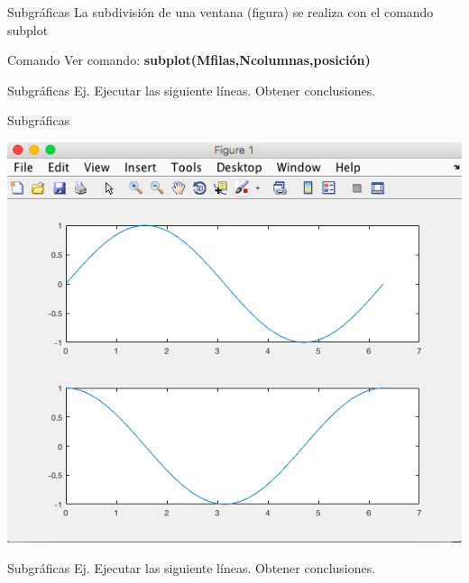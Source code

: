 \documentclass{bredelebeamer}
\begin{document}
\begin{frame}{Subgráficas}
La subdivisión de una ventana (figura) se realiza con el comando subplot
\begin{exampleblock}{Comando}
Ver comando: \textbf{subplot(Mfilas,Ncolumnas,posición)}
\end{exampleblock}
\end{frame}

\begin{frame}{Subgráficas}
Ej. Ejecutar las siguiente líneas. Obtener conclusiones.
\end{frame}

\begin{frame}{Subgráficas}
\begin{center}
\includegraphics[scale=0.35]{images/pantalla20.png}
\end{center}
\end{frame}

\begin{frame}{Subgráficas}
Ej. Ejecutar las siguiente líneas. Obtener conclusiones.
\end{frame}
\end{document}

